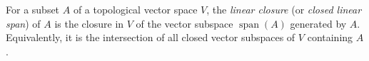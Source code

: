 
For a subset $A$ of a topological vector space $V$, the \emph{linear closure} (or \emph{closed linear span}) of $A$ is the closure in $V$ of the vector subspace $\operatorname{span}(A)$ generated by $A$. Equivalently, it is the intersection of all closed vector subspaces of $V$ containing $A$.
